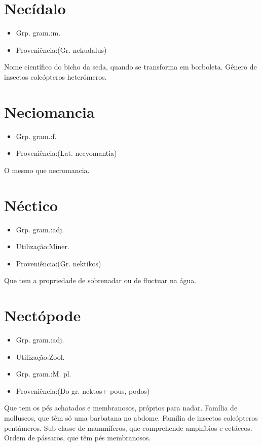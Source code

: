 \section{Necídalo}
\begin{itemize}
\item {Grp. gram.:m.}
\end{itemize}
\begin{itemize}
\item {Proveniência:(Gr. \textunderscore nekudalus\textunderscore )}
\end{itemize}
Nome científico do bicho da seda, quando se transforma em borboleta.
Gênero de insectos coleópteros heterómeros.
\section{Neciomancia}
\begin{itemize}
\item {Grp. gram.:f.}
\end{itemize}
\begin{itemize}
\item {Proveniência:(Lat. \textunderscore necyomantia\textunderscore )}
\end{itemize}
O mesmo que \textunderscore necromancia\textunderscore .
\section{Néctico}
\begin{itemize}
\item {Grp. gram.:adj.}
\end{itemize}
\begin{itemize}
\item {Utilização:Miner.}
\end{itemize}
\begin{itemize}
\item {Proveniência:(Gr. \textunderscore nektikos\textunderscore )}
\end{itemize}
Que tem a propriedade de sobrenadar ou de fluctuar na água.
\section{Nectópode}
\begin{itemize}
\item {Grp. gram.:adj.}
\end{itemize}
\begin{itemize}
\item {Utilização:Zool.}
\end{itemize}
\begin{itemize}
\item {Grp. gram.:M. pl.}
\end{itemize}
\begin{itemize}
\item {Proveniência:(Do gr. \textunderscore nektos\textunderscore  + \textunderscore pous\textunderscore , \textunderscore podos\textunderscore )}
\end{itemize}
Que tem os pés achatados e membranosos, próprios para nadar.
Família de molluscos, que têm só uma barbatana no abdome.
Família de insectos coleópteros pentâmeros.
Sub-classe de mammíferos, que comprehende amphíbios e cetáceos.
Ordem de pássaros, que têm pés membranosos.
